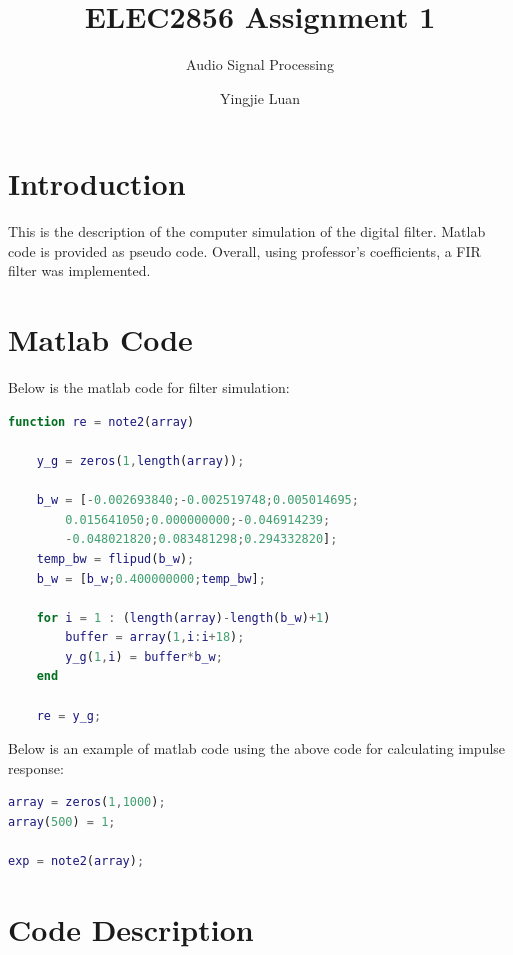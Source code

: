 \documentclass[11pt]{scrartcl}
\begin{document}
\title{ELEC2856 Assignment 1}
\subtitle{ Audio Signal Processing}
\author{Yingjie Luan}
\maketitle

\tableofcontents

\section{Introduction} %

This is the description of the computer simulation of the digital filter. Matlab code is provided as pseudo code. Overall, using professor's coefficients, a FIR filter was implemented.  



\section{Matlab Code} %

Below is the matlab code for filter simulation:
\begin{lstlisting}[language=Matlab]
function re = note2(array)
    
    y_g = zeros(1,length(array));
    
    b_w = [-0.002693840;-0.002519748;0.005014695;
        0.015641050;0.000000000;-0.046914239;
        -0.048021820;0.083481298;0.294332820];
    temp_bw = flipud(b_w);
    b_w = [b_w;0.400000000;temp_bw];
    
    for i = 1 : (length(array)-length(b_w)+1)
        buffer = array(1,i:i+18);
        y_g(1,i) = buffer*b_w;      
    end
    
    re = y_g;
\end{lstlisting}

Below is an example of matlab code using the above code for calculating impulse response:
\begin{lstlisting}[language=Matlab]
array = zeros(1,1000);
array(500) = 1;

exp = note2(array);
\end{lstlisting}


\section{Code Description} %
\end{document}
